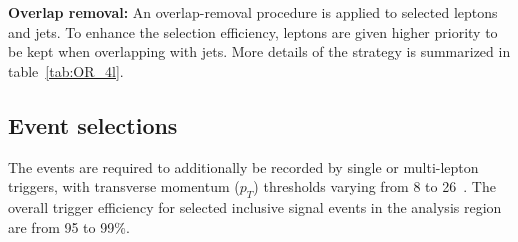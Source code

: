 \textbf{Overlap removal:} 
An overlap-removal procedure is applied to selected leptons and jets.
To enhance the selection efficiency, leptons are given higher priority to be kept when overlapping with jets.
More details of the strategy is summarized in table~\ref{tab:OR_4l}.
\begin{table}[htbp]
\begin{center}
\renewcommand\arraystretch{1.8}
\end{center}
\caption{Overlap removal criteria between pre-selection objects for the \llll channel. The overlap removal follows the order shown in this table. Once an object has been marked as removed, it does not participate in the subsequent stages of the overlap removal procedure. }
\label{tab:OR_4l}
\end{table}

\subsection{Event selections}

The events are required to additionally be recorded by single or multi-lepton triggers, with transverse momentum ($p_{T}$) thresholds varying from 8 to 26~\gev.
The overall trigger efficiency for selected inclusive \lllljj signal events in the analysis region are from 95 to 99\%.

